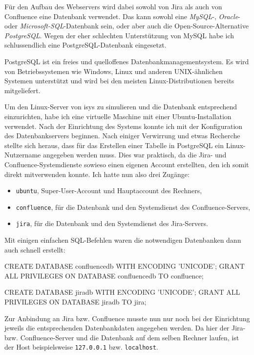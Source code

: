 \documentclass[xcolor=dvipsnames,11pt,paper=a4paper]{report}
\begin{document}
Für den Aufbau des Webservers wird dabei sowohl von Jira als auch von Confluence
eine Datenbank verwendet. Das kann sowohl eine \textit{MySQL}-, \textit{Oracle}-
oder \textit{Microsoft-SQL}-Datenbank sein, oder aber auch die Open-Source-Alternative
\textit{PostgreSQL}. Wegen der eher schlechten Unterstützung von MySQL habe ich
schlussendlich eine PostgreSQL-Datenbank eingesetzt.

PostgreSQL ist ein freies und quelloffenes Datenbankmanagementsystem. Es wird von
Betriebssystemen wie Windows, Linux und anderen UNIX-ähnlichen Systemen unterstützt
und wird bei den meisten Linux-Distributionen bereits mitgeliefert.

Um den Linux-Server von isys zu simulieren und die Datenbank entsprechend einzurichten,
habe ich eine virtuelle Maschine mit einer Ubuntu-Installation verwendet. Nach der
Einrichtung des Systems konnte ich mit der Konfiguration des Datenbankservers beginnen.
Nach einiger Verwirrung und etwas Recherche stellte sich heraus, dass für das Erstellen
einer Tabelle in PostgreSQL ein Linux-Nutzername angegeben werden muss. Dies war
praktisch, da die Jira- und Confluence-Systemdienste sowieso einen eigenen Account
erstellten, den ich somit direkt mitverwenden konnte. Ich hatte nun also drei Zugänge:

\begin{itemize}
	\item \texttt{ubuntu}, Super-User-Account und Hauptaccount des Rechners,
	\item \texttt{confluence}, für die Datenbank und den Systemdienst des Confluence-Servers,
	\item \texttt{jira}, für die Datenbank und den Systemdienst des Jira-Servers.
\end{itemize}

Mit einigen einfachen SQL-Befehlen waren die notwendigen Datenbanken dann auch schnell
erstellt:

\begin{code}[language=SQL, caption={SQL-Befehle zur Erstellung der Datenbanken}, label={lst:jira-database}]
CREATE DATABASE confluencedb WITH ENCODING 'UNICODE';
GRANT ALL PRIVILEGES ON DATABASE confluencedb TO confluence;

CREATE DATABASE jiradb WITH ENCODING 'UNICODE';
GRANT ALL PRIVILEGES ON DATABASE jiradb TO jira;
\end{code}

Zur Anbindung an Jira bzw. Confluence musste nun nur noch bei der Einrichtung jeweils
die entsprechenden Datenbankdaten angegeben werden. Da hier der Jira- bzw. Confluence-Server
und die Datenbank auf dem selben Rechner laufen, ist der Host beispielsweise \texttt{127.0.0.1}
bzw. \texttt{localhost}.
\end{document}
